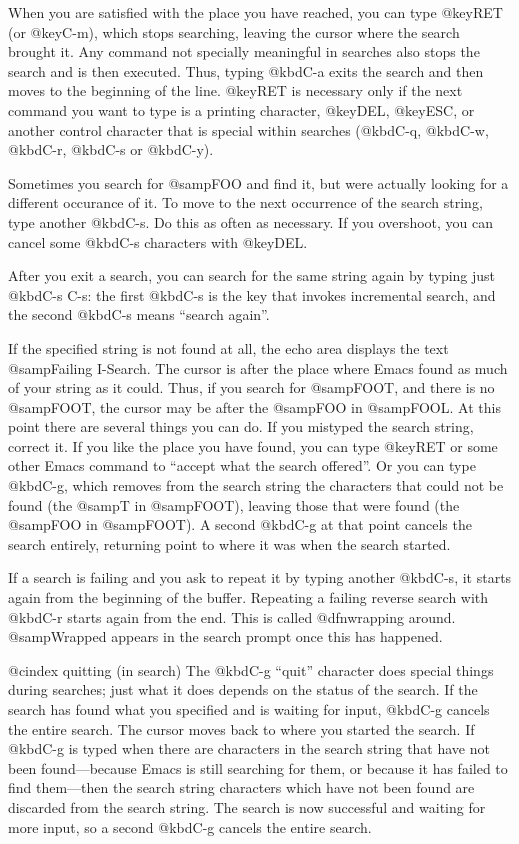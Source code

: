 {{{{  When you are satisfied with the place you have reached, you can type
@key{RET} (or @key{C-m}), which stops searching, leaving the cursor where 
the search brought it.  Any command not specially meaningful in searches also
stops the search and is then executed.  Thus, typing @kbd{C-a} exits the
search and then moves to the beginning of the line.  @key{RET} is necessary
only if the next command you want to type is a printing character,
@key{DEL}, @key{ESC}, or another control character that is special
within searches (@kbd{C-q}, @kbd{C-w}, @kbd{C-r}, @kbd{C-s} or @kbd{C-y}).

  Sometimes you search for @samp{FOO} and find it, but were actually
looking for a different occurance of it.  To move to the next occurrence
of the search string, type another @kbd{C-s}.  Do this as often as
necessary.  If you overshoot, you can cancel some @kbd{C-s}
characters with @key{DEL}.

  After you exit a search, you can search for the same string again by
typing just @kbd{C-s C-s}: the first @kbd{C-s} is the key that invokes
incremental search, and the second @kbd{C-s} means ``search again''.

  If the specified string is not found at all, the echo area displays
the text @samp{Failing I-Search}.  The cursor is after the place where
Emacs found as much of your string as it could.  Thus, if you search for
@samp{FOOT}, and there is no @samp{FOOT}, the cursor may be after the
@samp{FOO} in @samp{FOOL}.  At this point there are several things you
can do.  If you mistyped the search string, correct it.  If you like the
place you have found, you can type @key{RET} or some other Emacs command
to ``accept what the search offered''.  Or you can type @kbd{C-g}, which
removes from the search string the characters that could not be found
(the @samp{T} in @samp{FOOT}), leaving those that were found (the
@samp{FOO} in @samp{FOOT}).  A second @kbd{C-g} at that point cancels
the search entirely, returning point to where it was when the search
started.

  If a search is failing and you ask to repeat it by typing another
@kbd{C-s}, it starts again from the beginning of the buffer.  Repeating
a failing reverse search with @kbd{C-r} starts again from the end.  This
is called @dfn{wrapping around}.  @samp{Wrapped} appears in the search
prompt once this has happened.

@cindex quitting (in search)
  The @kbd{C-g} ``quit'' character does special things during searches;
just what it does depends on the status of the search.  If the search has
found what you specified and is waiting for input, @kbd{C-g} cancels the
entire search.  The cursor moves back to where you started the search.  If
@kbd{C-g} is typed when there are characters in the search string that have
not been found---because Emacs is still searching for them, or because it
has failed to find them---then the search string characters which have not
been found are discarded from the search string.  The
search is now successful and waiting for more input, so a second @kbd{C-g}
cancels the entire search.

}}}}
